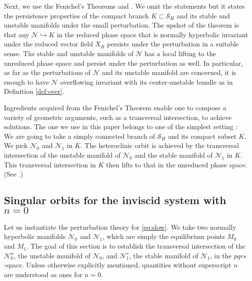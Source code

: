 \documentclass[a4paper,11pt]{article}
\theoremstyle{remark}
\begin{document}
Next, we use the Fenichel's Theorems \cite[Theorem 12.2]{fenichel_geometric_1979} and \cite[Theorem 3]{fenichel_asymptotic_1977}.%
We omit the statements but it states the persistence properties of the compact branch $K\subset\mathcal{S}_H$ and its stable and unstable manifolds under the small perturbation. The upshot of the theorem is that any $\mathcal{N}\hookrightarrow K$ in the reduced phase space that is normally hyperbolic invariant under the reduced vector field $X_R$ persists under the perturbation in a suitable sense. The stable and unstable manifolds of $\mathcal{N}$ has a local lifting to the unreduced phase space and persist under the perturbation as well. In particular, as far as the perturbations of $\mathcal{N}$ and its unstable manifold are concerned, it is enough to have $\mathcal{N}$ overflowing invariant with its center-unstable bundle as in Definition \ref{def:over}.

Ingredients acquired from the Fenichel's Theorem enable one to compose a variety of geometric arguments, such as a transversal intersection, to achieve solutions. The one we use in this paper belongs to one of the simplest setting \cite[Theorem 3.1]{Sz1991}: We are going to take a simply connected branch of  $\mathcal{S}_H$ and its compact subset $K$. We pick $\mathcal{N}_0$ and $\mathcal{N}_1$ in $K$. The heteroclinic orbit is achieved by the transversal intersection of the unstable manifold of $\mathcal{N}_0$ and the stable manifold of $\mathcal{N}_1$ in $K$. This transversal intersection in $K$ then lifts to that in the unreduced phase space. (See \cite{Sz1991}.) %

\subsection{Singular orbits for the inviscid system with $n=0$}

Let us instantiate the perturbation theory for \eqref{eq:slow}. We take two normally hyperbolic manifolds %
$\mathcal{N}_0$ and $\mathcal{N}_1$, which are simply the equilibrium points $M_0$ and $M_1$. The goal of this section is to establish the transversal intersection of the $\mathcal{N}_0^u$, the unstable manifold of $\mathcal{N}_0$, and $\mathcal{N}^s_1$, the stable manifold of $\mathcal{N}_1$, in the $pqrs$-space. Unless otherwise explicitly mentioned, quantities without superscript $n$ are understood as ones for $n=0$. %
\end{document}
